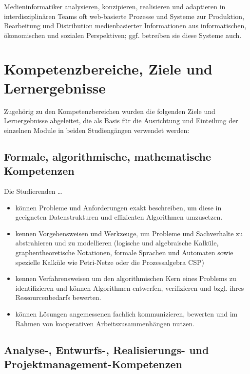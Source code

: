 Medieninformatiker analysieren, konzipieren, realisieren und adaptieren
in interdisziplinären Teams oft web-basierte Prozesse und Systeme zur
Produktion, Bearbeitung und Distribution medienbasierter Informationen
aus informatischen, ökonomischen und sozialen Perspektiven; ggf.
betreiben sie diese Systeme auch.

\section{Kompetenzbereiche, Ziele und
Lernergebnisse}\label{kompetenzbereiche-ziele-und-lernergebnisse}

Zugehörig zu den Kompetenzbereichen wurden die folgenden Ziele und
Lernergebnisse abgeleitet, die als Basis für die Ausrichtung und
Einteilung der einzelnen Module in beiden Studiengängen verwendet
werden:

\subsection{Formale, algorithmische, mathematische
Kompetenzen}\label{formale-algorithmische-mathematische-kompetenzen}

Die Studierenden \ldots{}

\begin{itemize}
\tightlist
\item
  können Probleme und Anforderungen exakt beschreiben, um diese in
  geeigneten Datenstrukturen und effizienten Algorithmen umzusetzen.
\item
  kennen Vorgehensweisen und Werkzeuge, um Probleme und Sachverhalte zu
  abstrahieren und zu modellieren (logische und algebraische Kalküle,
  graphentheoretische Notationen, formale Sprachen und Automaten sowie
  spezielle Kalküle wie Petri-Netze oder die Prozessalgebra CSP)
\item
  kennen Verfahrensweisen um den algorithmischen Kern eines Problems zu
  identifizieren und können Algorithmen entwerfen, verifizieren und
  bzgl. ihres Ressourcenbedarfs bewerten.
\item
  können Lösungen angemessenen fachlich kommunizieren, bewerten und im
  Rahmen von kooperativen Arbeitszusammenhängen nutzen.
\end{itemize}

\subsection{Analyse-, Entwurfs-, Realisierungs- und
Projektmanagement-Kompetenzen}\label{analyse--entwurfs--realisierungs--und-projektmanagement-kompetenzen}

